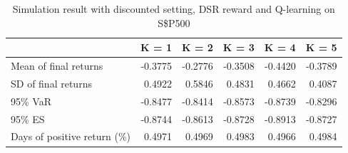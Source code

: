\documentclass{article}
\begin{document}
\begin{table}[H]
\centering
\begin{tabular}{|l|r|r|r|r|r|} 
\hline
                             & \multicolumn{1}{l|}{K = 1} & \multicolumn{1}{l|}{K = 2} & \multicolumn{1}{l|}{K = 3} & \multicolumn{1}{l|}{K = 4} & \multicolumn{1}{l|}{K = 5}  \\ 
\hline
Mean of final returns        & -0.3775                    & -0.2776                    & -0.3508                    & -0.4420                    & -0.3789                     \\ 
\hline
SD of final returns          & 0.4922                     & 0.5846                     & 0.4831                     & 0.4662                     & 0.4087                      \\ 
\hline
95\% VaR                     & -0.8477                    & -0.8414                    & -0.8573                    & -0.8739                    & -0.8296                     \\ 
\hline
95\% ES                      & -0.8744                    & -0.8613                    & -0.8728                    & -0.8913                    & -0.8727                     \\ 
\hline
Days of positive return (\%) & 0.4971                     & 0.4969                     & 0.4983                     & 0.4966                     & 0.4984                      \\
\hline
\end{tabular}
\caption{Simulation result with discounted setting, DSR reward and Q-learning on S\$P500}
\label{table22}
\end{table}
\end{document}
